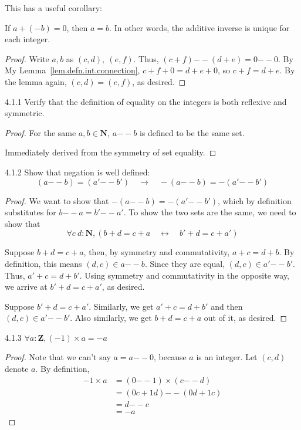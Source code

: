 This has a useful corollary:
\begin{coro}\label{coro.uniq.int.add.inverse}
If $a+(-b) = 0$, then $a=b$. In other words, the additive inverse is unique for
each integer.
\end{coro}
\begin{proof}
	Write $a,b$ as $(c,d),\ (e,f)$. Thus, $(c+f){--}(d+e) = 0{--}0$. By My
	Lemma~\ref{lem.defn.int.connection}, $c+f+0=d+e+0$, so $c+f=d+e$. By the
	lemma again, $(c,d) = (e,f)$, as desired.
\end{proof}

\begin{exercise}{4.1.1}
	Verify that the definition of equality on the integers is both reflexive and
	symmetric.
\end{exercise}
\begin{proof}
 For the same $a,b \in \mathbf{N}$, $a{--}b$ is defined to
be the same set.

 Immediately derived from the symmetry of set equality.
\end{proof}

\begin{exercise}{4.1.2}
	Show that negation is well defined:
	\[
	(a{--}b) = (a'{--}b') \quad\to\quad 
	-(a{--}b) = -(a'{--}b')
	\]
\end{exercise}
\begin{proof}
We want to show that $-(a{--}b) = -(a'{--}b')$, which by definition substitutes
for $b{--}a = b'{--}a'$. To show the two sets are the same, we need to show that 
\[
	\forall c\ d : \mathbf{N}, (b+d=c+a \quad\leftrightarrow\quad b'+d = c+a')
\]

\myifbox Suppose $b+d=c+a$, then, by symmetry and commutativity, $a+c = d+b$. By
definition, this means $(d,c) \in a{--}b$. Since they are equal, $(d,c) \in
a'{--}b'$. Thus, $a'+c=d+b'$. Using symmetry and commutativity in the opposite
way, we arrive at $b'+d = c+a'$, as desired.

\myoifbox Suppose $b'+d = c+a'$. Similarly, we get $a'+c=d+b'$ and then $(d,c)
\in a'{--}b'$. Also similarly, we get $b+d=c+a$ out of it, as desired.
\end{proof}

\begin{exercise}{4.1.3}
	$\forall a : \mathbf{Z}, (-1)\times a = -a$
\end{exercise}
\begin{proof}
	Note that we can't say $a = a{--}0$, because $a$ is an integer. Let $(c,d)$
	denote $a$. By definition,
\begin{align*}
-1 \times a 
&= (0 {--} 1) \times (c{--}d) \\
&= (0c + 1d) {--} (0d + 1c) \\
&= d{--}c\\
&= -a
\end{align*}
\end{proof}


